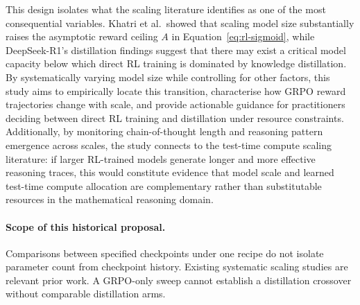 This design isolates what the scaling literature identifies as one of the most
consequential variables.  Khatri et al.\ showed that scaling model size
substantially raises the asymptotic reward ceiling $A$ in
Equation~\eqref{eq:rl-sigmoid}, while DeepSeek-R1's distillation findings
suggest that there may exist a critical model capacity below which direct RL
training is dominated by knowledge distillation.  By systematically varying
model size while controlling for other factors, this study aims to empirically
locate this transition, characterise how GRPO reward trajectories change with
scale, and provide actionable guidance for practitioners deciding between direct
RL training and distillation under resource constraints.  Additionally, by
monitoring chain-of-thought length and reasoning pattern emergence across
scales, the study connects to the test-time compute scaling literature: if
larger RL-trained models generate longer and more effective reasoning traces,
this would constitute evidence that model scale and learned test-time compute
allocation are complementary rather than substitutable resources in the
mathematical reasoning domain.

\paragraph{Scope of this historical proposal.} Comparisons between specified checkpoints under one recipe do not isolate parameter count from checkpoint history. Existing systematic scaling studies are relevant prior work. A GRPO-only sweep cannot establish a distillation crossover without comparable distillation arms.
